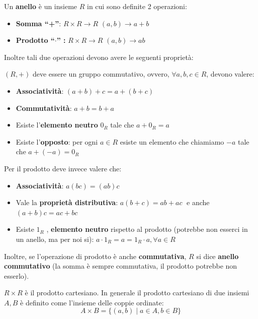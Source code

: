 \documentclass[
  a4paper,
]{article}
\providecommand{\tightlist}{%
  \setlength{\itemsep}{0pt}\setlength{\parskip}{0pt}}
\providecommand{\tightlist}{}
\begin{document}
\begin{definitionbox}
Un \textbf{anello} è un insieme \(R\) in cui sono definite 2 operazioni:

\begin{itemize}
\tightlist
\item
  \textbf{Somma ``+''}: \(R \times R \to R\) \((a, b) \to a + b\)
\item
  \textbf{Prodotto ``\(\cdot\)'' :} \(R \times R \to R\)
  \((a, b) \to ab\)
\end{itemize}

Inoltre tali due operazioni devono avere le seguenti proprietà:

\((R, +)\) deve essere un gruppo commutativo, ovvero,
\(\forall a, b, c \in R\), devono valere:

\begin{itemize}
\tightlist
\item
  \textbf{Associatività}: \((a+b) + c = a + (b+c)\)
\item
  \textbf{Commutatività}: \(a + b = b + a\)
\item
  Esiste l'\textbf{elemento neutro} \(0_R\) tale che \(a + 0_R = a\)
\item
  Esiste l'\textbf{opposto}: per ogni \(a \in R\) esiste un elemento che
  chiamiamo \(-a\) tale che \(a + (-a) = 0_R\)
\end{itemize}

Per il prodotto deve invece valere che:

\begin{itemize}
\tightlist
\item
  \textbf{Associatività}: \(a(bc)=(ab)c\)
\item
  Vale la \textbf{proprietà distributiva}: \(a(b + c) = ab + ac \;\) e
  anche \((a + b)c = ac + bc\)
\item
  Esiste \(1_R\) , \textbf{elemento neutro} rispetto al prodotto
  (potrebbe non esserci in un anello, ma per noi si):
  \(a \cdot 1_R = a = 1_R \cdot a, \forall a \in R\)
\end{itemize}

Inoltre, se l'operazione di prodotto è anche \textbf{commutativa}, \(R\)
si dice \textbf{anello commutativo} (la somma è sempre commutativa, il
prodotto potrebbe non esserlo).
\end{definitionbox}

\begin{notebox}
\(R \times R\) è il prodotto cartesiano. In generale il prodotto
cartesiano di due insiemi \(A, B\) è definito come l'insieme delle
coppie ordinate: \[
A \times B = \{(a, b) \; | \; a \in A, b \in B\}
\]
\end{notebox}
\end{document}
